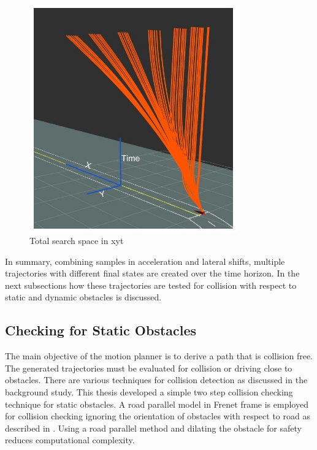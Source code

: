  \begin{figure}
	\centering
	\includegraphics[width=0.8\textwidth]{Images/concept/searchspace2.jpg}
	\caption{Total search space in xyt}
	\label{searchspace}
\end{figure}



In summary, combining samples in acceleration and lateral shifts, multiple trajectories with different final states are created over the time horizon. In the next subsections how these trajectories are tested for collision with respect to static and dynamic obstacles is discussed. 


\subsection{Checking for Static Obstacles} \label{osbtacle_check_satic}
The main objective of the motion planner is to derive a path that is collision free. The generated trajectories must be evaluated for collision or driving close to obstacles. There are various techniques for collision detection as discussed in the background study. This thesis developed a simple two step collision checking technique for static obstacles. A road parallel model in Frenet frame is employed for collision checking ignoring the orientation of obstacles with respect to road as described in \cite{cmu_parallel_thesis}. Using a road parallel method and dilating the obstacle for safety reduces computational complexity. 

